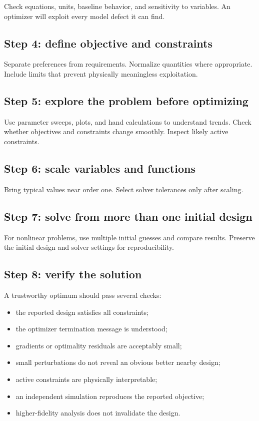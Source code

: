 \documentclass[11pt]{article}
\begin{document}
Check equations, units, baseline behavior, and sensitivity to variables. An optimizer will exploit every model defect it can find.

\subsection{Step 4: define objective and constraints}

Separate preferences from requirements. Normalize quantities where appropriate. Include limits that prevent physically meaningless exploitation.

\subsection{Step 5: explore the problem before optimizing}

Use parameter sweeps, plots, and hand calculations to understand trends. Check whether objectives and constraints change smoothly. Inspect likely active constraints.

\subsection{Step 6: scale variables and functions}

Bring typical values near order one. Select solver tolerances only after scaling.

\subsection{Step 7: solve from more than one initial design}

For nonlinear problems, use multiple initial guesses and compare results. Preserve the initial design and solver settings for reproducibility.

\subsection{Step 8: verify the solution}

A trustworthy optimum should pass several checks:
\begin{itemize}[leftmargin=1.4em]
  \item the reported design satisfies all constraints;
  \item the optimizer termination message is understood;
  \item gradients or optimality residuals are acceptably small;
  \item small perturbations do not reveal an obvious better nearby design;
  \item active constraints are physically interpretable;
  \item an independent simulation reproduces the reported objective;
  \item higher-fidelity analysis does not invalidate the design.
\end{itemize}
\end{document}
